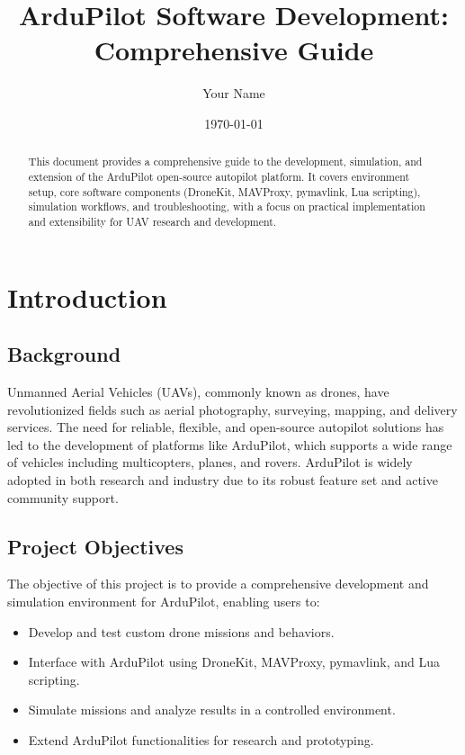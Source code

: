 \documentclass[12pt,a4paper]{report}
\title{ArduPilot Software Development: Comprehensive Guide}
\author{Your Name}
\date{\today}
\begin{document}
\maketitle

\begin{abstract}
This document provides a comprehensive guide to the development, simulation, and extension of the ArduPilot open-source autopilot platform. It covers environment setup, core software components (DroneKit, MAVProxy, pymavlink, Lua scripting), simulation workflows, and troubleshooting, with a focus on practical implementation and extensibility for UAV research and development.
\end{abstract}

\tableofcontents
\listoffigures
\listoftables

\chapter{Introduction}
\section{Background}
Unmanned Aerial Vehicles (UAVs), commonly known as drones, have revolutionized fields such as aerial photography, surveying, mapping, and delivery services. The need for reliable, flexible, and open-source autopilot solutions has led to the development of platforms like ArduPilot, which supports a wide range of vehicles including multicopters, planes, and rovers. ArduPilot is widely adopted in both research and industry due to its robust feature set and active community support.

\section{Project Objectives}
The objective of this project is to provide a comprehensive development and simulation environment for ArduPilot, enabling users to:
\begin{itemize}
    \item Develop and test custom drone missions and behaviors.
    \item Interface with ArduPilot using DroneKit, MAVProxy, pymavlink, and Lua scripting.
    \item Simulate missions and analyze results in a controlled environment.
    \item Extend ArduPilot functionalities for research and prototyping.
\end{itemize}
\end{document}
